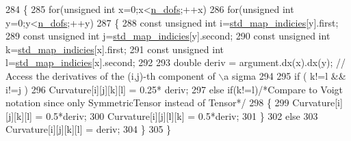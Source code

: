 \begin{DoxyCode}
284     \{
285          \textcolor{keywordflow}{for}(\textcolor{keywordtype}{unsigned} \textcolor{keywordtype}{int} x=0;x<\hyperlink{classSacado__Wrapper_1_1SymTensor2_ad9d6542de5481e0d41bd1831cb0aeaff}{n\_dofs};++x)
286             \textcolor{keywordflow}{for}(\textcolor{keywordtype}{unsigned} \textcolor{keywordtype}{int} y=0;y<\hyperlink{classSacado__Wrapper_1_1SymTensor2_ad9d6542de5481e0d41bd1831cb0aeaff}{n\_dofs};++y)
287             \{
288                 \textcolor{keyword}{const} \textcolor{keywordtype}{unsigned} \textcolor{keywordtype}{int} i=\hyperlink{classSacado__Wrapper_1_1SymTensor2_a1c6b89438714315ae209f4687b687505}{std\_map\_indicies}[y].first;
289                 \textcolor{keyword}{const} \textcolor{keywordtype}{unsigned} \textcolor{keywordtype}{int} j=\hyperlink{classSacado__Wrapper_1_1SymTensor2_a1c6b89438714315ae209f4687b687505}{std\_map\_indicies}[y].second;
290                 \textcolor{keyword}{const} \textcolor{keywordtype}{unsigned} \textcolor{keywordtype}{int} k=\hyperlink{classSacado__Wrapper_1_1SymTensor2_a1c6b89438714315ae209f4687b687505}{std\_map\_indicies}[x].first;
291                 \textcolor{keyword}{const} \textcolor{keywordtype}{unsigned} \textcolor{keywordtype}{int} l=\hyperlink{classSacado__Wrapper_1_1SymTensor2_a1c6b89438714315ae209f4687b687505}{std\_map\_indicies}[x].second;
292 
293                 \textcolor{keywordtype}{double} deriv = argument.dx(x).dx(y); \textcolor{comment}{// Access the derivatives of the (i,j)-th component of
       \(\backslash\)a sigma}
294 
295                 \textcolor{keywordflow}{if} ( k!=l && i!=j )
296                     Curvature[i][j][k][l] = 0.25* deriv;
297                 \textcolor{keywordflow}{else} \textcolor{keywordflow}{if}(k!=l)\textcolor{comment}{/*Compare to Voigt notation since only SymmetricTensor instead of Tensor*/}
298                 \{
299                     Curvature[i][j][k][l] = 0.5*deriv;
300                     Curvature[i][j][l][k] = 0.5*deriv;
301                 \}
302                 \textcolor{keywordflow}{else}
303                     Curvature[i][j][k][l] = deriv;
304             \}
305     \}
\end{DoxyCode}
